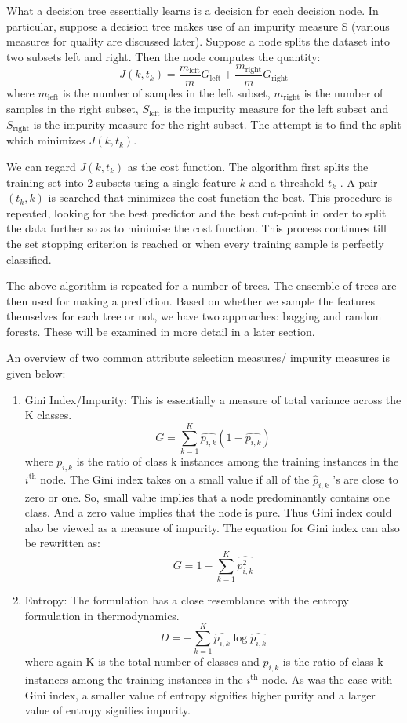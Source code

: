 \documentclass[conference]{IEEEtran}
\begin{document}
What a decision tree essentially learns is a decision for each decision node. In particular, suppose a decision tree makes use of an impurity measure S (various measures for quality are discussed later). Suppose a node splits the dataset into two subsets left and right. Then the node computes the quantity:
$$ J(k, t_k) = \frac{m_\textrm{left}}{m}G_\textrm{left} + \frac{m_\textrm{right}}{m}G_\textrm{right} $$ where $m_\textrm{left}$ is the number of samples in the left subset, $m_\textrm{right}$ is the number of samples in the right subset, $S_\textrm{left}$ is the impurity measure for the left subset and $S_\textrm{right}$ is the impurity measure for the right subset. The attempt is to find the split which minimizes $J(k, t_k)$.

We can regard $J(k, t_k)$ as the cost function. The algorithm first splits the training set into 2 subsets using a single feature $k$ and a threshold $t_k$ . A pair $(t_k , k)$ is searched that minimizes the cost function the best. This procedure is repeated, looking for the best predictor and the best cut-point in order to split the data further so as to minimise the cost function. This process
continues till the set stopping criterion is reached or when every training sample is perfectly classified.

The above algorithm is repeated for a number of trees. The ensemble of trees are then used for making a prediction. Based on whether we sample the features themselves for each tree or not, we have two approaches: bagging and random forests. These will be examined in more detail in a later section.

An overview of two common attribute selection measures/ impurity measures is given below:

\begin{enumerate}

    \item Gini Index/Impurity: This is essentially a measure of total variance across the K classes.
    $$ G = \sum_{k=1}^{K}\hat{p_{i, k}}(1 - \hat{p_{i, k}}) $$ where $p_{i,k}$ is the ratio of class k instances among the training instances in the ${i^\textrm{th}}$ node. The Gini index takes on a small value if all of the $\hat{p}_{i,k}$ ’s are close to zero or one. So, small value implies that a node predominantly contains one class. And a zero value implies that the node is pure. Thus Gini index could also be viewed as a measure of impurity. The equation for Gini index can also be rewritten as:
    $$ G = 1 - \sum_{k=1}^{K}\hat{p_{i, k}^2} $$
    
    \item Entropy: The formulation has a close resemblance with the entropy formulation in thermodynamics. 
    $$ D = -\sum_{k = 1}^{K}\hat{p_{i, k}}\log{\hat{p_{i, k}}} $$ where again K is the total number of classes and $p_{i,k}$ is the ratio of class k instances among the training instances in the ${i^\textrm{th}}$ node. As was the case with Gini index, a smaller value of entropy signifies higher purity and a larger value of entropy signifies impurity.
\end{enumerate}
\end{document}
